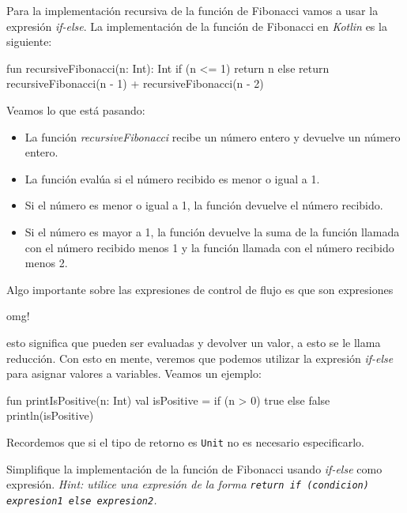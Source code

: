       Para la implementación recursiva de la función de Fibonacci vamos a usar la expresión 
      \textit{if-else}.
      La implementación de la función de Fibonacci en \textit{Kotlin} es la siguiente:

      \begin{kotlin}
        fun recursiveFibonacci(n: Int): Int {
          if (n <= 1) {
            return n
          } else {
            return recursiveFibonacci(n - 1) + recursiveFibonacci(n - 2)
          }
        }
      \end{kotlin}

      Veamos lo que está pasando:

      \begin{itemize}
        \item La función \textit{recursiveFibonacci} recibe un número entero y devuelve un
          número entero.
        \item La función evalúa si el número recibido es menor o igual a 1.
        \item Si el número es menor o igual a 1, la función devuelve el número recibido.
        \item Si el número es mayor a 1, la función devuelve la suma de la función llamada con el
          número recibido menos 1 y la función llamada con el número recibido menos 2.
      \end{itemize}
      
      Algo importante sobre las expresiones de control de flujo es que son expresiones

      \begin{center}
        omg!
      \end{center}

      esto significa que pueden ser evaluadas y devolver un valor, a esto se le llama reducción.
      Con esto en mente, veremos que podemos utilizar la expresión \textit{if-else} para asignar
      valores a variables.
      Veamos un ejemplo:

      \begin{kotlin}
        fun printIsPositive(n: Int) {
          val isPositive = if (n > 0) {
            true
          } else {
            false
          }
          println(isPositive)
        }
      \end{kotlin}

      Recordemos que si el tipo de retorno es \texttt{Unit} no es necesario especificarlo.

      \begin{exercise}
        Simplifique la implementación de la función de Fibonacci usando \textit{if-else} como 
        expresión.
        \textit{Hint: utilice una expresión de la forma \texttt{return if (condicion) {expresion1} 
        else {expresion2}}.}
      \end{exercise}